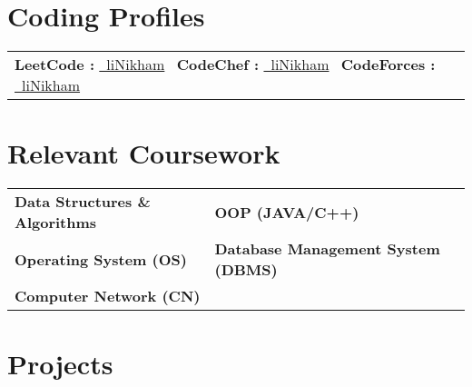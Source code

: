 \documentclass[a4paper,12pt]{article}
\begin{document}
\section{Coding Profiles}
\begin{tabularx}{\linewidth}{@{}l X@{}}	
\textbf{LeetCode :} \href{https://leetcode.com/liNikham}
{\raisebox{-0.05\height}\ liNikham} \ 
\textbf{CodeChef :} \href{https://www.codechef.com/users/mahadiknikhil}
{\raisebox{-0.05\height}\ liNikham} \ 
\textbf{CodeForces :} \href{https://codeforces.com/profile/NikhilMahadik}
{\raisebox{-0.05\height}\ liNikham} \ 
\end{tabularx}






\section{Relevant Coursework}
\begin{tabularx}{\linewidth}{@{}X X@{}}	
\textbf{Data Structures \& Algorithms} & \textbf{OOP (JAVA/C++)} \\
\textbf{Operating System (OS)} & \textbf{Database Management System (DBMS)} \\
\textbf{Computer Network (CN)} & \\
\end{tabularx}







\section{Projects}
\end{document}
